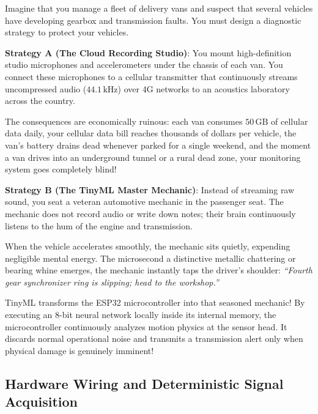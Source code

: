 \begin{analogy}
Imagine that you manage a fleet of delivery vans and suspect that several vehicles have developing gearbox and transmission faults. You must design a diagnostic strategy to protect your vehicles.

\textbf{Strategy A (The Cloud Recording Studio)}:
You mount high-definition studio microphones and accelerometers under the chassis of each van. You connect these microphones to a cellular transmitter that continuously streams uncompressed audio ($44.1\,\text{kHz}$) over 4G networks to an acoustics laboratory across the country. 

The consequences are economically ruinous: each van consumes $50\,\text{GB}$ of cellular data daily, your cellular data bill reaches thousands of dollars per vehicle, the van's battery drains dead whenever parked for a single weekend, and the moment a van drives into an underground tunnel or a rural dead zone, your monitoring system goes completely blind!

\textbf{Strategy B (The TinyML Master Mechanic)}:
Instead of streaming raw sound, you seat a veteran automotive mechanic in the passenger seat. The mechanic does not record audio or write down notes; their brain continuously listens to the hum of the engine and transmission. 

When the vehicle accelerates smoothly, the mechanic sits quietly, expending negligible mental energy. The microsecond a distinctive metallic chattering or bearing whine emerges, the mechanic instantly taps the driver's shoulder: \emph{``Fourth gear synchronizer ring is slipping; head to the workshop.''}

TinyML transforms the ESP32 microcontroller into that seasoned mechanic! By executing an 8-bit neural network locally inside its internal memory, the microcontroller continuously analyzes motion physics at the sensor head. It discards normal operational noise and transmits a transmission alert only when physical damage is genuinely imminent!
\end{analogy}

\subsection{Hardware Wiring and Deterministic Signal Acquisition}\label{subsec:p3_hardware}

